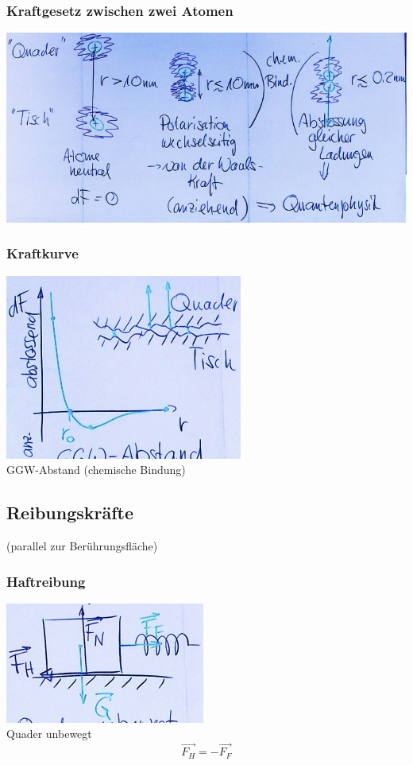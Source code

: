 \subsubsection{Kraftgesetz zwischen zwei Atomen}
\includegraphics{Bild26}

\subsubsection{Kraftkurve}
\includegraphics{Bild27} \\
GGW-Abstand (chemische Bindung)

\subsection{Reibungskräfte}
(parallel zur Berührungsfläche)

\subsubsection{Haftreibung}
\includegraphics{Bild28} \\
Quader unbewegt \\
\[ \vec{F_H} = -\vec{F_F} \]

